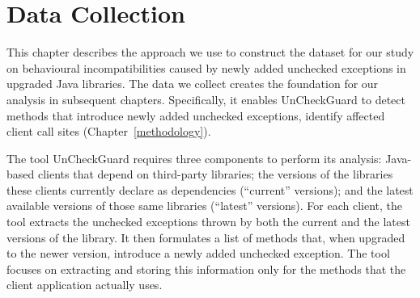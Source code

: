 \chapter{Data Collection}\label{data}

This chapter describes the approach we use to construct the dataset for our study on behavioural incompatibilities caused by newly added unchecked exceptions in upgraded Java libraries. The data we collect creates the foundation for our analysis in subsequent chapters. Specifically, it enables UnCheckGuard to detect methods that introduce newly added unchecked exceptions, identify affected client call sites (Chapter~\ref{methodology}).


The tool UnCheckGuard requires three components to perform its analysis: Java-based clients that depend on third-party libraries; the versions of the libraries these clients currently declare as dependencies (“current” versions); and the latest available versions of those same libraries (“latest” versions). For each client, the tool extracts the unchecked exceptions thrown by both the current and the latest versions of the library. It then formulates a list of methods that, when upgraded to the newer version, introduce a newly added unchecked exception. The tool focuses on extracting and storing this information only for the methods that the client application actually uses.


